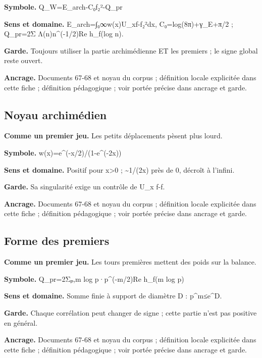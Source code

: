 \documentclass[
  9pt,
  a4paper,
]{article}
\begin{document}
\textbf{Symbole.}
Q\_W=E\_arch-C₀\textbar\textbar f\textbar\textbar₂²-Q\_pr

\textbf{Sens et domaine.}
E\_arch=∫₀∞w(x)\textbar\textbar U\_xf-f\textbar\textbar₂²dx,
C₀=log(8π)+γ\_E+π/2 ; Q\_pr=2Σ Λ(n)n\^{}(-1/2)Re h\_f(log n).

\textbf{Garde.} Toujours utiliser la partie archimédienne ET les
premiers ; le signe global reste ouvert.

\textbf{Ancrage.} Documents 67-68 et noyau du corpus ; définition locale
explicitée dans cette fiche ; définition pédagogique ; voir portée
précise dans ancrage et garde.

\hypertarget{noyau-archimuxe9dien}{%
\subsection{Noyau archimédien}\label{noyau-archimuxe9dien}}

\textbf{Comme un premier jeu.} Les petits déplacements pèsent plus
lourd.

\textbf{Symbole.} w(x)=e\^{}(-x/2)/(1-e\^{}(-2x))

\textbf{Sens et domaine.} Positif pour x\textgreater0 ;
\textasciitilde1/(2x) près de 0, décroît à l'infini.

\textbf{Garde.} Sa singularité exige un contrôle de U\_x f-f.

\textbf{Ancrage.} Documents 67-68 et noyau du corpus ; définition locale
explicitée dans cette fiche ; définition pédagogique ; voir portée
précise dans ancrage et garde.

\hypertarget{forme-des-premiers}{%
\subsection{Forme des premiers}\label{forme-des-premiers}}

\textbf{Comme un premier jeu.} Les tours premières mettent des poids sur
la balance.

\textbf{Symbole.} Q\_pr=2Σₚ,m log p·p\^{}(-m/2)Re h\_f(m log p)

\textbf{Sens et domaine.} Somme finie à support de diamètre D :
p\^{}m≤e\^{}D.

\textbf{Garde.} Chaque corrélation peut changer de signe ; cette partie
n'est pas positive en général.

\textbf{Ancrage.} Documents 67-68 et noyau du corpus ; définition locale
explicitée dans cette fiche ; définition pédagogique ; voir portée
précise dans ancrage et garde.
\end{document}
